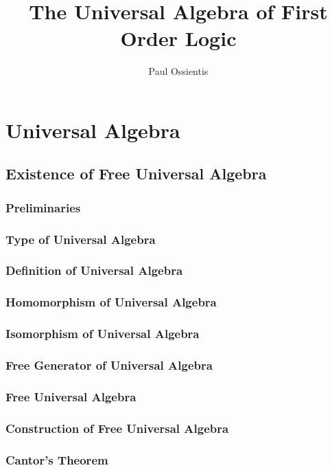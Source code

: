 \documentclass{report}
\title{The Universal Algebra of
  First Order Logic}
\author{Paul Ossientis}
\begin{document}
\maketitle
\tableofcontents
\newpage
\chapter{Universal Algebra}
\section{Existence of Free Universal Algebra}
    \subsection{Preliminaries}
    \subsection{Type of Universal Algebra}
    \subsection{Definition of Universal Algebra}
    \subsection{Homomorphism of Universal Algebra}
    \subsection{Isomorphism of Universal Algebra}
    \subsection{Free Generator of Universal Algebra}
    \subsection{Free Universal Algebra}
    \subsection{Construction of Free Universal Algebra}
    \subsection{Cantor's Theorem} 
\end{document}
